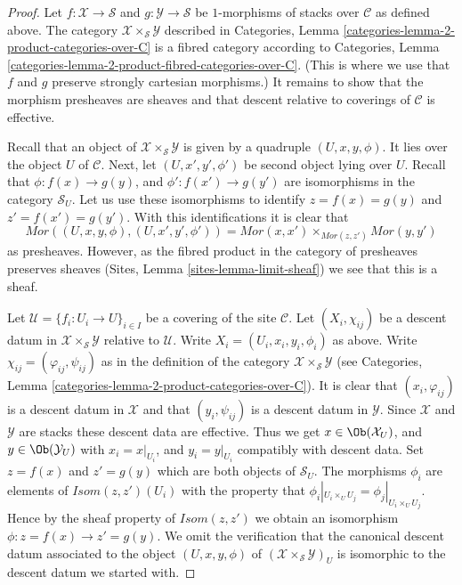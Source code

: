 \begin{proof}
Let $f : \mathcal{X} \to \mathcal{S}$ and
$g : \mathcal{Y} \to \mathcal{S}$ be
$1$-morphisms of stacks over $\mathcal{C}$
as defined above. The category
$\mathcal{X} \times_\mathcal{S} \mathcal{Y}$
described in
Categories, Lemma \ref{categories-lemma-2-product-categories-over-C} is a
fibred category according to
Categories, Lemma \ref{categories-lemma-2-product-fibred-categories-over-C}.
(This is where we use that $f$ and $g$ preserve strongly cartesian
morphisms.) It remains to show that the morphism presheaves are sheaves
and that descent relative to coverings of $\mathcal{C}$ is effective.

\medskip\noindent
Recall that an object of $\mathcal{X} \times_\mathcal{S} \mathcal{Y}$
is given by a quadruple $(U, x, y, \phi)$.
It lies over the object
$U$ of $\mathcal{C}$. Next, let $(U, x', y', \phi')$ be second
object lying over $U$.
Recall that $\phi : f(x) \to g(y)$, and $\phi' : f(x') \to g(y')$
are isomorphisms in the category $\mathcal{S}_U$. Let us
use these isomorphisms to identify $z = f(x) = g(y)$ and
$z' = f(x') = g(y')$. With this identifications
it is clear that
$$
\mathit{Mor}((U, x, y, \phi), (U, x', y', \phi'))
=
\mathit{Mor}(x, x')
\times_{\mathit{Mor}(z, z')}
\mathit{Mor}(y, y')
$$
as presheaves. However, as the fibred product in the category of
presheaves preserves sheaves (Sites, Lemma \ref{sites-lemma-limit-sheaf})
we see that this is a sheaf.

\medskip\noindent
Let $\mathcal{U} = \{f_i : U_i \to U\}_{i \in I}$ be a covering of the site
$\mathcal{C}$. Let $(X_i, \chi_{ij})$ be a descent datum
in $\mathcal{X} \times_\mathcal{S} \mathcal{Y}$ relative to $\mathcal{U}$.
Write $X_i = (U_i, x_i, y_i, \phi_i)$ as above. Write
$\chi_{ij} = (\varphi_{ij}, \psi_{ij})$ as in the definition of
the category $\mathcal{X} \times_\mathcal{S} \mathcal{Y}$ (see
Categories, Lemma \ref{categories-lemma-2-product-categories-over-C}).
It is clear that $(x_i, \varphi_{ij})$ is a descent datum in
$\mathcal{X}$ and that $(y_i, \psi_{ij})$ is a descent datum in
$\mathcal{Y}$. Since $\mathcal{X}$ and $\mathcal{Y}$ are stacks these
descent data are effective. Thus we get
$x \in \Ob(\mathcal{X}_U)$, and $y \in \Ob(\mathcal{Y}_U)$
with $x_i = x|_{U_i}$, and $y_i = y|_{U_i}$ compatibly with descent data.
Set $z = f(x)$ and $z' = g(y)$ which are both objects of $\mathcal{S}_U$.
The morphisms $\phi_i$ are elements of
$\mathit{Isom}(z, z')(U_i)$ with the property that
$\phi_i|_{U_i \times_U U_j} = \phi_j|_{U_i \times_U U_j}$.
Hence by the sheaf property of $\mathit{Isom}(z, z')$
we obtain an isomorphism $\phi : z = f(x) \to z' = g(y)$.
We omit the verification that the canonical descent datum associated to
the object $(U, x, y, \phi)$ of
$(\mathcal{X} \times_\mathcal{S} \mathcal{Y})_U$ is isomorphic
to the descent datum we started with.
\end{proof}

